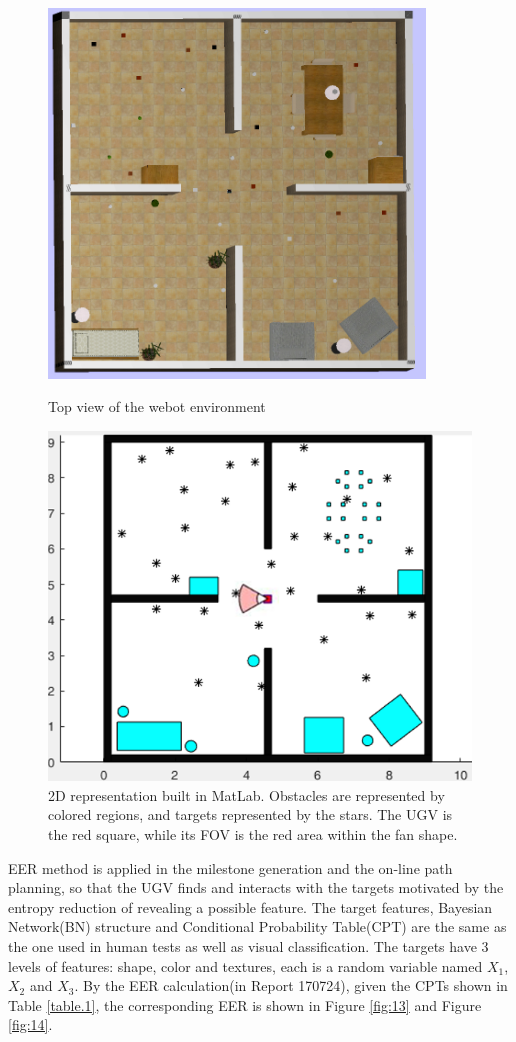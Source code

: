 \documentclass[12pt,draftcls,onecolumn]{IEEEtran}
\begin{document}
\begin{figure}[p]
\centering
\includegraphics[width=10cm]{figures/webotTop}
  \caption{Top view of the webot environment}
  \label{fig:1}
\includegraphics[width=13cm]{figures/newWorld}
  \caption{2D representation built in MatLab. Obstacles are represented by colored regions, and targets represented by the stars. The UGV is  the red square, while its FOV is the red area within the fan shape.}
  \label{fig:2}
\end{figure}


EER method is applied in the milestone generation and the on-line path planning, so that the UGV finds and interacts with the targets motivated by the entropy reduction of revealing a possible feature. 
The target features, Bayesian Network(BN) structure and Conditional Probability Table(CPT) are the same as the one used in human tests as well as visual classification.
The targets have 3 levels of features: shape, color and textures, each is a random variable named $X_{1}$, $X_{2}$ and $X_{3}$.
By the EER calculation(in Report 170724), given the CPTs shown in Table \ref{table.1}, the corresponding EER is shown in  Figure \ref{fig:13} and  Figure \ref{fig:14}.
\end{document}
